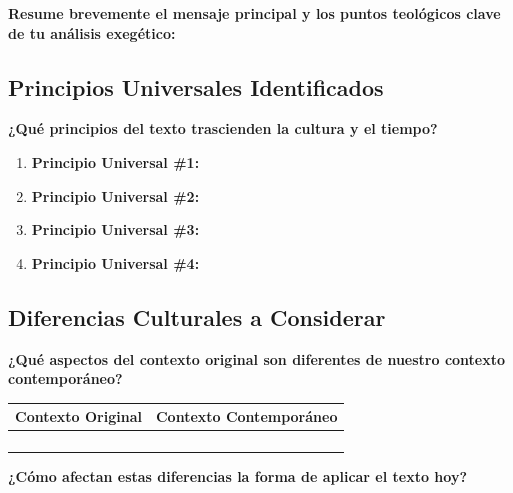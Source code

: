 \documentclass[11pt,a4paper]{article}
\begin{document}
\begin{applicationbox}
\textbf{Resume brevemente el mensaje principal y los puntos teológicos clave de tu análisis exegético:}
\end{applicationbox}

\vspace{4cm}

\subsection{Principios Universales Identificados}

\textbf{¿Qué principios del texto trascienden la cultura y el tiempo?}

\begin{enumerate}[leftmargin=1cm]
    \item \textbf{Principio Universal \#1:}
    \vspace{2cm}
    
    \item \textbf{Principio Universal \#2:}
    \vspace{2cm}
    
    \item \textbf{Principio Universal \#3:}
    \vspace{2cm}
    
    \item \textbf{Principio Universal \#4:}
    \vspace{2cm}
\end{enumerate}

\subsection{Diferencias Culturales a Considerar}

\textbf{¿Qué aspectos del contexto original son diferentes de nuestro contexto contemporáneo?}

\begin{tabularx}{\textwidth}{|X|X|}
\hline
\textbf{Contexto Original} & \textbf{Contexto Contemporáneo} \\
\hline
& \\[1.5cm]
\hline
& \\[1.5cm]
\hline
& \\[1.5cm]
\hline
& \\[1.5cm]
\hline
\end{tabularx}

\textbf{¿Cómo afectan estas diferencias la forma de aplicar el texto hoy?}
\vspace{3cm}
\end{document}
